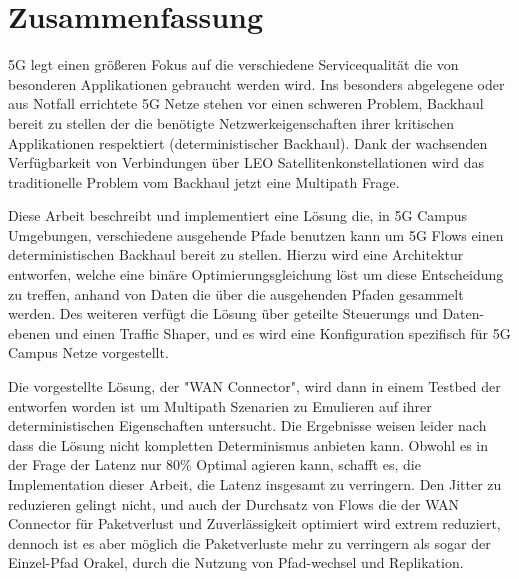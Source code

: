 \cleardoublepage
{}
\section*{Zusammenfassung}


5G legt einen größeren Fokus auf die verschiedene Servicequalität die von besonderen Applikationen gebraucht werden wird. Ins besonders abgelegene oder aus Notfall errichtete 5G Netze stehen vor einen schweren Problem, Backhaul bereit zu stellen der die benötigte Netzwerkeigenschaften ihrer kritischen Applikationen respektiert (deterministischer Backhaul). Dank der wachsenden Verfügbarkeit von Verbindungen über LEO Satellitenkonstellationen wird das traditionelle Problem vom Backhaul jetzt eine Multipath Frage.

Diese Arbeit beschreibt und implementiert eine Lösung die, in 5G Campus Umgebungen, verschiedene ausgehende Pfade benutzen kann um 5G Flows einen deterministischen Backhaul bereit zu stellen. Hierzu wird eine Architektur entworfen, welche eine binäre Optimierungsgleichung löst um diese Entscheidung zu treffen, anhand von Daten die über die ausgehenden Pfaden gesammelt werden. Des weiteren verfügt die Lösung über geteilte Steuerungs und Daten-ebenen und einen Traffic Shaper, und es wird eine Konfiguration spezifisch für 5G Campus Netze vorgestellt.

Die vorgestellte Lösung, der "WAN Connector", wird dann in einem Testbed der entworfen worden ist um Multipath Szenarien zu Emulieren auf ihrer deterministischen Eigenschaften untersucht. Die Ergebnisse weisen leider nach dass die Lösung nicht kompletten Determinismus anbieten kann. Obwohl es in der Frage der Latenz nur 80\% Optimal agieren kann, schafft es, die Implementation dieser Arbeit, die Latenz insgesamt zu verringern. Den Jitter zu reduzieren gelingt nicht, und auch der Durchsatz von Flows die der WAN Connector für Paketverlust und Zuverlässigkeit optimiert wird extrem reduziert, dennoch ist es aber möglich die Paketverluste mehr zu verringern als sogar der Einzel-Pfad Orakel, durch die Nutzung von Pfad-wechsel und Replikation.

